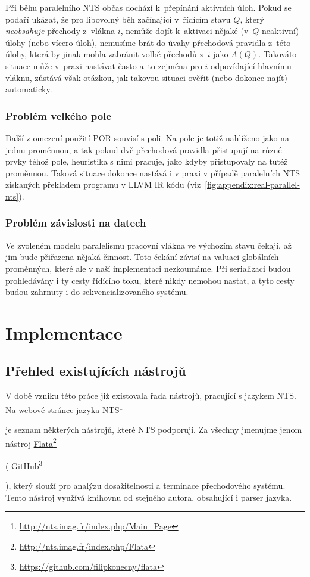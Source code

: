 \documentclass[12pt]{fithesis2}
\newcommand\fnurl[2]{%
  \href{#2}{#1}\footnote{\url{#2}}%
}
\begin{document}
Při běhu paralelního NTS občas dochází k~přepínání aktivních úloh. Pokud se podaří ukázat, že pro libovolný běh začínající v~řídícím stavu $Q$, který \textit{neobsahuje} přechody z~vlákna $i$, nemůže dojít k~aktivaci nějaké (v~$Q$ neaktivní) úlohy (nebo vícero úloh), nemusíme brát do úvahy přechodová pravidla z~této úlohy, která by jinak mohla zabránit volbě přechodů z~$i$ jako $A(Q)$. Takováto situace může v~praxi nastávat často a~to zejména pro $i$ odpovídající hlavnímu vláknu, zůstává však otázkou, jak takovou situaci ověřit (nebo dokonce najít) automaticky.

\subsection{Problém velkého pole}
Další z omezení použití POR souvisí s poli. Na pole je totiž nahlíženo jako na jednu proměnnou, a tak pokud dvě přechodová pravidla přistupují na různé prvky téhož pole, heuristika s nimi pracuje, jako kdyby přistupovaly na tutéž proměnnou. Taková situace dokonce nastává i v praxi v případě paralelních NTS získaných překladem programu v LLVM IR kódu (viz~\ref{fig:appendix:real-parallel-nts}).

\subsection{Problém závislosti na datech}
Ve zvoleném modelu paralelismu pracovní vlákna ve výchozím stavu čekají, až jim bude přiřazena nějaká činnost. Toto čekání závisí na valuaci globálních proměnných, které ale v naší implementaci nezkoumáme. Při serializaci budou prohledávány i ty cesty řídícího toku, které nikdy nemohou nastat, a tyto cesty budou zahrnuty i do sekvencializovaného systému.


\chapter{Implementace}
\label{sec:implementation}
\section{Přehled existujících nástrojů}
V době vzniku této práce již existovala řada nástrojů, pracující s jazykem NTS. Na webové stránce jazyka
\fnurl{NTS}{http://nts.imag.fr/index.php/Main_Page}
je seznam některých nástrojů, které NTS podporují. Za všechny jmenujme jenom nástroj
\fnurl{Flata}{http://nts.imag.fr/index.php/Flata}
(
\fnurl{GitHub}{https://github.com/filipkonecny/flata}
), který slouží pro analýzu dosažitelnosti a terminace přechodového systému. Tento nástroj využívá knihovnu od stejného autora, obsahující i parser jazyka.
\end{document}
